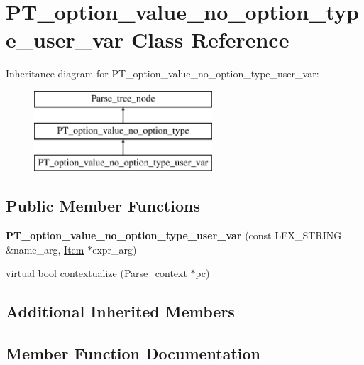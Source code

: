 \hypertarget{classPT__option__value__no__option__type__user__var}{}\section{P\+T\+\_\+option\+\_\+value\+\_\+no\+\_\+option\+\_\+type\+\_\+user\+\_\+var Class Reference}
\label{classPT__option__value__no__option__type__user__var}
Inheritance diagram for P\+T\+\_\+option\+\_\+value\+\_\+no\+\_\+option\+\_\+type\+\_\+user\+\_\+var\+:\begin{figure}[H]
\begin{center}
\leavevmode
\includegraphics[height=3.000000cm]{classPT__option__value__no__option__type__user__var}
\end{center}
\end{figure}
\subsection*{Public Member Functions}
\begin{DoxyCompactItemize}
\item 
\mbox{\label{classPT__option__value__no__option__type__user__var_abe81e3ee467c5db4acfd6c95645c8f2a}} 
{\bfseries P\+T\+\_\+option\+\_\+value\+\_\+no\+\_\+option\+\_\+type\+\_\+user\+\_\+var} (const L\+E\+X\+\_\+\+S\+T\+R\+I\+NG \&name\+\_\+arg, \mbox{\hyperlink{classItem}{Item}} $\ast$expr\+\_\+arg)
\item 
virtual bool \mbox{\hyperlink{classPT__option__value__no__option__type__user__var_af5670585b4c428d1dc13e282ce534605}{contextualize}} (\mbox{\hyperlink{structParse__context}{Parse\+\_\+context}} $\ast$pc)
\end{DoxyCompactItemize}
\subsection*{Additional Inherited Members}


\subsection{Member Function Documentation}
\mbox{\label{classPT__option__value__no__option__type__user__var_af5670585b4c428d1dc13e282ce534605}} 
